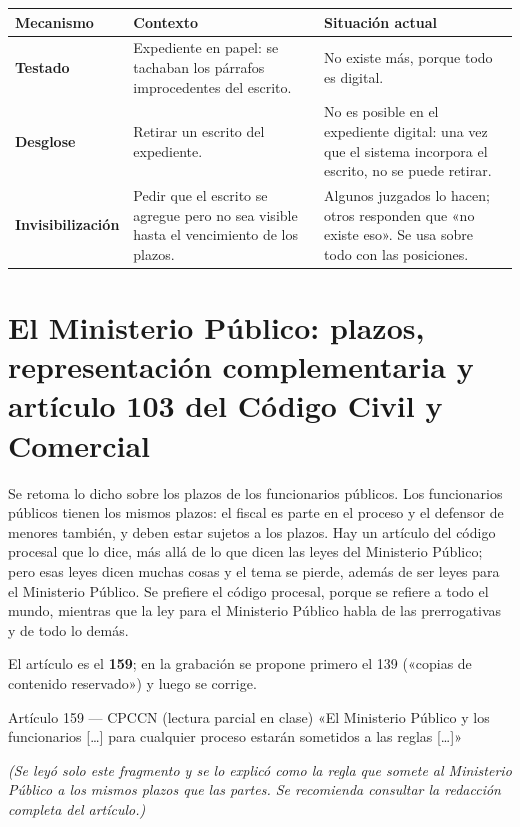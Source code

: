 \documentclass[12pt,oneside]{book}
\begin{document}
\begin{table}[H]
\centering
\small
\begin{tabularx}{\textwidth}{L{0.20\textwidth} Y Y}
\toprule
\textbf{Mecanismo} & \textbf{Contexto} & \textbf{Situación actual} \\
\midrule
\textbf{Testado} & Expediente en papel: se tachaban los párrafos improcedentes del escrito. & No existe más, porque todo es digital. \\
\textbf{Desglose} & Retirar un escrito del expediente. & No es posible en el expediente digital: una vez que el sistema incorpora el escrito, no se puede retirar. \\
\textbf{Invisibilización} & Pedir que el escrito se agregue pero no sea visible hasta el vencimiento de los plazos. & Algunos juzgados lo hacen; otros responden que «no existe eso». Se usa sobre todo con las posiciones. \\
\bottomrule
\end{tabularx}
\end{table}

\section{El Ministerio Público: plazos, representación complementaria y artículo 103 del Código Civil y Comercial}

Se retoma lo dicho sobre los plazos de los funcionarios públicos. Los funcionarios públicos tienen los mismos plazos: el fiscal es parte en el proceso y el defensor de menores también, y deben estar sujetos a los plazos. Hay un artículo del código procesal que lo dice, más allá de lo que dicen las leyes del Ministerio Público; pero esas leyes dicen muchas cosas y el tema se pierde, además de ser leyes para el Ministerio Público. Se prefiere el código procesal, porque se refiere a todo el mundo, mientras que la ley para el Ministerio Público habla de las prerrogativas y de todo lo demás.

El artículo es el \textbf{159}; en la grabación se propone primero el 139 («copias de contenido reservado») y luego se corrige.

\begin{norma}{Artículo 159 --- CPCCN (lectura parcial en clase)}
«El Ministerio Público y los funcionarios [\ldots] para cualquier proceso estarán sometidos a las reglas [\ldots]»

\textit{(Se leyó solo este fragmento y se lo explicó como la regla que somete al Ministerio Público a los mismos plazos que las partes. Se recomienda consultar la redacción completa del artículo.)}
\end{norma}
\end{document}
